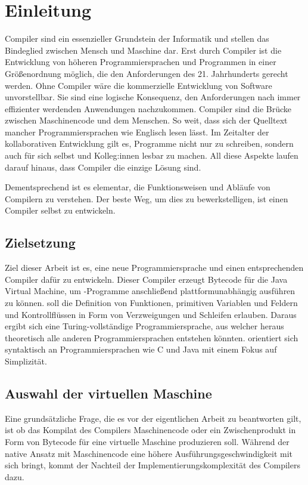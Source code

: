 \chapter{Einleitung}
\label{cha:Einleitung}

Compiler sind ein essenzieller Grundstein der Informatik und stellen das Bindeglied zwischen Mensch und Maschine dar. Erst durch Compiler ist die Entwicklung von höheren Programmiersprachen und Programmen in einer Größenordnung möglich, die den Anforderungen des 21. Jahrhunderts gerecht werden. Ohne Compiler wäre die kommerzielle Entwicklung von Software unvorstellbar. Sie sind eine logische Konsequenz, den Anforderungen nach immer effizienter werdenden Anwendungen nachzukommen. Compiler sind die Brücke zwischen Maschinencode und dem Menschen. So weit, dass sich der Quelltext mancher Programmiersprachen wie Englisch lesen lässt. Im Zeitalter der kollaborativen Entwicklung gilt es, Programme nicht nur zu schreiben, sondern auch für sich selbst und Kolleg:innen lesbar zu machen. All diese Aspekte laufen darauf hinaus, dass Compiler die einzige Lösung sind.

Dementsprechend ist es elementar, die Funktionsweisen und Abläufe von Compilern zu verstehen. Der beste Weg, um dies zu bewerkstelligen, ist einen Compiler selbst zu entwickeln.

\section{Zielsetzung}

Ziel dieser Arbeit ist es, eine neue Programmiersprache und einen entsprechenden Compiler dafür zu entwickeln. Dieser Compiler erzeugt Bytecode für die Java Virtual Machine, um \toya-Programme anschließend plattformunabhängig ausführen zu können. \Toya soll die Definition von Funktionen, primitiven Variablen und Feldern und Kontrollflüssen in Form von Verzweigungen und Schleifen erlauben. Daraus ergibt sich eine Turing-vollständige Programmiersprache, aus welcher heraus theoretisch alle anderen Programmiersprachen entstehen könnten. \Toya orientiert sich syntaktisch an Programmiersprachen wie C und Java mit einem Fokus auf Simplizität.

\section{Auswahl der virtuellen Maschine}

Eine grundsätzliche Frage, die es vor der eigentlichen Arbeit zu beantworten gilt, ist ob das Kompilat des \toya Compilers Maschinencode oder ein Zwischenprodukt in Form von Bytecode für eine virtuelle Maschine produzieren soll. Während der native Ansatz mit Maschinencode eine höhere Ausführungsgeschwindigkeit mit sich bringt, kommt der Nachteil der Implementierungskomplexität des Compilers dazu.

